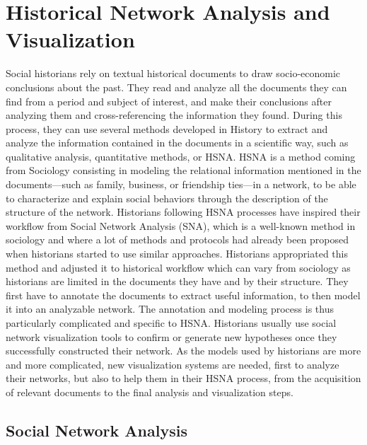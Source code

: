 
\chapter{Historical Network Analysis and Visualization}\label{ch:related-work}

Social historians rely on textual historical documents to draw socio-economic conclusions about the past.
They read and analyze all the documents they can find from a period and subject of interest, and make their conclusions after analyzing them and cross-referencing the information they found.
During this process, they can use several methods developed in History to extract and analyze the information contained in the documents in a scientific way, such as qualitative analysis, quantitative methods, or HSNA.
HSNA is a method coming from Sociology consisting in modeling the relational information mentioned in the documents---such as family, business, or friendship ties---in a network, to be able to characterize and explain social behaviors through the description of the structure of the network.
Historians following HSNA processes have inspired their workflow from Social Network Analysis (SNA), which is a well-known method in sociology and where a lot of methods and protocols had already been proposed when historians started to use similar approaches.
Historians appropriated this method and adjusted it to historical workflow which can vary from sociology as historians are limited in the documents they have and by their structure.
They first have to annotate the documents to extract useful information, to then model it into an analyzable network.
The annotation and modeling process is thus particularly complicated and specific to HSNA.
Historians usually use social network visualization tools to confirm or generate new hypotheses once they successfully constructed their network.
As the models used by historians are more and more complicated, new visualization systems are needed, first to analyze their networks, but also to help them in their HSNA process, from the acquisition of relevant documents to the final analysis and visualization steps.



\section{Social Network Analysis}

